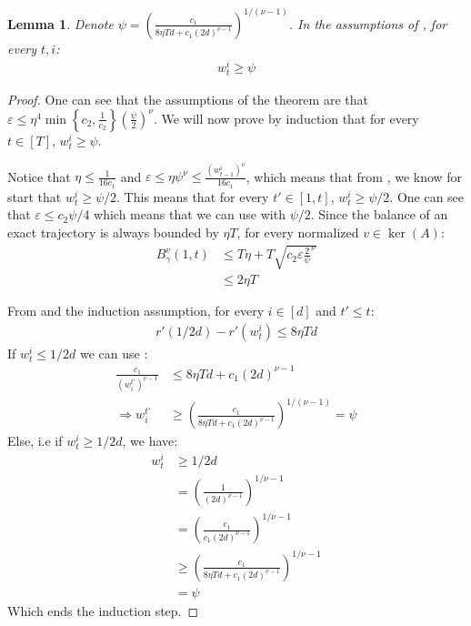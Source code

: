 \documentclass[10pt]{article}
\newtheorem{lemma}[theorem]{Lemma}
\theoremstyle{definition}
\theoremstyle{remark}
\renewcommand{\epsilon}{\varepsilon}
\newcommand{\curly}[1]{ {\left\{ #1 \right\}}}
\newcommand{\roundy}[1]{ {\left( #1 \right)}}
\newcommand{\barconst}{\nu}
\begin{document}
\begin{lemma}\label{lem:nonentropy_iterate_lb}
Denote $\psi = \roundy{\frac{c_1}{8\eta Td + c_1(2d)^{\barconst-1}}}^{1/(\barconst-1)}$. In the assumptions of , for every $t,i$:
\begin{align*}
    w_t^i \ge \psi
\end{align*}
\end{lemma}
\begin{proof}
One can see that the assumptions of the theorem are that $\epsilon \le \eta^4\min\curly{c_2,\frac{1}{c_2}}\roundy{\frac{\psi}{2}}^{\barconst}$. We will now prove by induction that for every $t\in[T]$, $w_t^i \ge \psi$.

Notice that $\eta \le \frac{1}{16c_1}$ and $\epsilon \le \eta\psi^{\barconst} \le \frac{(w_{t-1}^i)^\barconst}{16c_1}$, which means that from , we know for start that $w_t^i \ge \psi/2$. This means that for every $t'\in[1,t]$, $w_t^i \ge \psi/2$. One can see that $\epsilon \le c_2\psi/4$ which means that we can use  with $\psi/2$. Since the balance of an exact trajectory is always bounded by $\eta T$, for every normalized $v\in \ker(A)$:
\begin{align*}
    B_\gamma^v(1,t)
    &\le T\eta + T\sqrt{c_2\epsilon\frac{2}{\psi}^{\barconst}} \\
    &\le 2\eta T
\end{align*}

From  and the induction assumption, for every $i\in [d]$ and $t'\le t$: 
\begin{align*}
    r'(1/2d)-r'(w_t^i) \le 8\eta Td
\end{align*}
If $w_t^i \le 1/2d$ we can use :
\begin{align*}
\frac{c_1}{\roundy{w_i^{t'}}^{\barconst-1}} &\le 8\eta Td + c_1(2d)^{\barconst-1}\\
\Rightarrow w_i^{t'} &\ge \roundy{\frac{c_1}{8\eta Td + c_1(2d)^{\barconst-1}}}^{1/(\barconst-1)} = \psi
\end{align*}
Else, i.e if $w_t^i \ge 1/2d$, we have:
\begin{align*}
    w_t^i &\ge 1/2d\\
    &= \roundy{\frac{1}{(2d)^{\barconst-1}}}^{1/\barconst-1}\\
    &= \roundy{\frac{c_1}{c_1(2d)^{\barconst-1}}}^{1/\barconst-1}\\
    &\ge \roundy{\frac{c_1}{8\eta Td + c_1(2d)^{\barconst-1}}}^{1/\barconst-1}\\
    &= \psi
\end{align*}
Which ends the induction step.
\end{proof}
\end{document}
